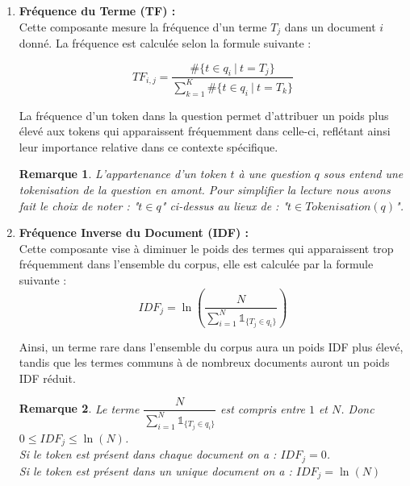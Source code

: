 \documentclass[12pt]{article}
\newtheorem{rmq}{Remarque}
\theoremstyle{definition}
\begin{document}
	\begin{enumerate}
		\item \textbf{Fréquence du Terme (TF) :}\\
		
		Cette composante mesure la fréquence d'un terme $T_j$ dans un document $i$ donné. La fréquence est calculée selon la formule suivante : 
		
		$$  TF_{i,j} = \dfrac{\#\{t\in q_i ~|~ t = T_j\}}{\displaystyle\sum_{k=1}^{K}\#\{t\in q_i ~|~ t = T_k\}}$$
		
		

		La fréquence d'un token dans la question permet d'attribuer un poids plus élevé aux tokens qui apparaissent fréquemment dans celle-ci, reflétant ainsi leur importance relative dans ce contexte spécifique.\\
		
		\begin{rmq}
		L'appartenance d'un token $t$ à une question $q$ sous entend une tokenisation de la question en amont. Pour simplifier la lecture nous avons fait le choix de noter : "$t\in q$" ci-dessus au lieux de : "$t\in Tokenisation(q)$". \\ 
		\end{rmq}
		
		
		\item \textbf{Fréquence Inverse du Document (IDF) :} \\
		
		Cette composante vise à diminuer le poids des termes qui apparaissent trop fréquemment dans l'ensemble du corpus, elle est calculée par la formule suivante :
		$$  IDF_{j} = \ln\left(\dfrac{N}{\sum_{i=1}^{N}\mathbb{1}_{\{T_j \in q_i\}}}\right)$$ 
		
		Ainsi, un terme rare dans l'ensemble du corpus aura un poids IDF plus élevé, tandis que les termes communs à de nombreux documents auront un poids IDF réduit.\\

		\begin{rmq}
			Le terme $\dfrac{N}{\sum_{i=1}^{N}\mathbb{1}_{\{T_j \in q_i\}}}$ est compris entre $1$ et $N$. Donc $0\leq IDF_{j} \leq \ln(N)$.\\
			
			Si le token est présent dans chaque document on a : $IDF_{j} = 0$.\\
			Si le token est présent dans un unique document on a : $IDF_{j} = \ln(N)$  
		\end{rmq}
		
	\end{enumerate}
	
\end{document}
